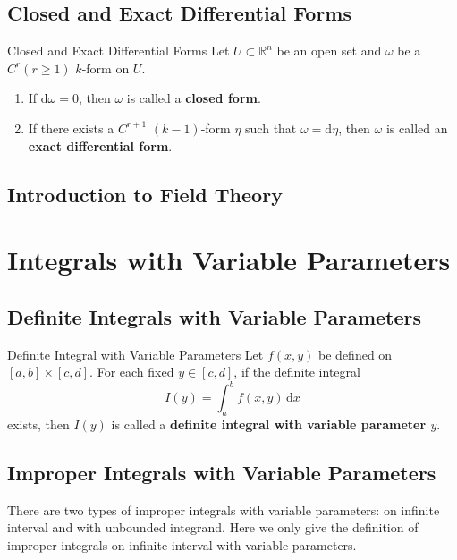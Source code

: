 \documentclass[11pt]{../../TexTemplate/elegantbook}
\begin{document}
\section{Closed and Exact Differential Forms}
\begin{definition}{Closed and Exact Differential Forms}
    Let \(U \subset \mathbb{R}^{n}\) be an open set and \(\omega\) be a \(C^{r}(r\geqslant 1)\) \(k\)-form on \(U\).
    \begin{enumerate}
        \item If \(\mathrm{d}\omega = 0\), then \(\omega\) is called a \textbf{closed form}.
        \item If there exists a \(C^{r+1}\) \((k-1)\)-form \(\eta\) such that \(\omega = \mathrm{d}\eta\),
            then \(\omega\) is called an \textbf{exact differential form}.
    \end{enumerate}
\end{definition}



\section{Introduction to Field Theory}

\chapter{Integrals with Variable Parameters}
\section{Definite Integrals with Variable Parameters}
\begin{definition}{Definite Integral with Variable Parameters}
    Let \(f(x, y)\) be defined on \([a, b] \times [c, d]\).
    For each fixed \(y \in [c, d]\), if the definite integral
    \[
    I(y) = \int_{a}^{b} f(x, y) \, \mathrm{d}x
    \]
    exists, then \(I(y)\) is called a \textbf{definite integral with variable parameter \(y\)}.
\end{definition}

\section{Improper Integrals with Variable Parameters}
There are two types of improper integrals with variable parameters: 
on infinite interval and with unbounded integrand.
Here we only give the definition of improper integrals on infinite interval with variable parameters.
\end{document}
